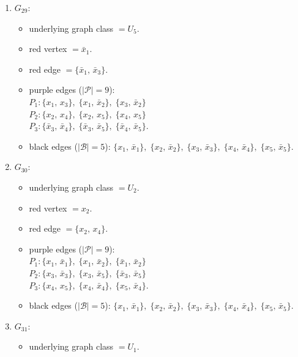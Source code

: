 \begin{enumerate}[leftmargin=*]
\begin{itemize}[leftmargin=*]
\item black edges ($|\mathcal{B}|=5$): $\{x_{1},\,\bar{x}_{1}\},\; \{x_{2},\,\bar{x}_{2}\},\; \{x_{3},\,\bar{x}_{3}\},\; \{x_{4},\,\bar{x}_{4}\},\; \{x_{5},\,\bar{x}_{5}\}$.
\end{itemize}
\item $G_{29}$:
\begin{itemize}[leftmargin=*]
\item underlying graph class $= U_5$.
\item red vertex $= \bar{x}_{1}$.
\item red edge $= \{\bar{x}_{1},\,\bar{x}_{3}\}$.
\item purple edges ($|\mathcal{P}|=9$):\mbox{}\\
$P_{1}: \{x_{1},\,x_{3}\},\; \{x_{1},\,\bar{x}_{2}\},\; \{x_{3},\,\bar{x}_{2}\}$\\
$P_{2}: \{x_{2},\,x_{4}\},\; \{x_{2},\,x_{5}\},\; \{x_{4},\,x_{5}\}$\\
$P_{3}: \{\bar{x}_{3},\,\bar{x}_{4}\},\; \{\bar{x}_{3},\,\bar{x}_{5}\},\; \{\bar{x}_{4},\,\bar{x}_{5}\}$.
\item black edges ($|\mathcal{B}|=5$): $\{x_{1},\,\bar{x}_{1}\},\; \{x_{2},\,\bar{x}_{2}\},\; \{x_{3},\,\bar{x}_{3}\},\; \{x_{4},\,\bar{x}_{4}\},\; \{x_{5},\,\bar{x}_{5}\}$.
\end{itemize}
\item $G_{30}$:
\begin{itemize}[leftmargin=*]
\item underlying graph class $= U_2$.
\item red vertex $= x_{2}$.
\item red edge $= \{x_{2},\,x_{4}\}$.
\item purple edges ($|\mathcal{P}|=9$):\mbox{}\\
$P_{1}: \{x_{1},\,\bar{x}_{1}\},\; \{x_{1},\,\bar{x}_{2}\},\; \{\bar{x}_{1},\,\bar{x}_{2}\}$\\
$P_{2}: \{x_{3},\,\bar{x}_{3}\},\; \{x_{3},\,\bar{x}_{5}\},\; \{\bar{x}_{3},\,\bar{x}_{5}\}$\\
$P_{3}: \{x_{4},\,x_{5}\},\; \{x_{4},\,\bar{x}_{4}\},\; \{x_{5},\,\bar{x}_{4}\}$.
\item black edges ($|\mathcal{B}|=5$): $\{x_{1},\,\bar{x}_{1}\},\; \{x_{2},\,\bar{x}_{2}\},\; \{x_{3},\,\bar{x}_{3}\},\; \{x_{4},\,\bar{x}_{4}\},\; \{x_{5},\,\bar{x}_{5}\}$.
\end{itemize}
\item $G_{31}$:
\begin{itemize}[leftmargin=*]
\item underlying graph class $= U_1$.

\end{itemize}
\end{enumerate}
